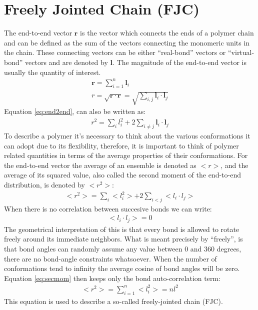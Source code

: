 \section{Freely Jointed Chain (FJC)}
The end-to-end  vector $\mathbf{r}$ is  the vector which  connects the
ends of a polymer  chain and can be defined as the  sum of the vectors
connecting the monomeric units  in the chain. These connecting vectors
can be  either ``real-bond''  vectors or ``virtual-bond''  vectors and
are denoted  by $\mathbf{l}$.  The magnitude of  the end-to-end vector
is usually the quantity of interest.
\begin{gather}
\mathbf{r} = \sum_{i=1}^{n} \mathbf{l}_{i}\\
\label{eq:end2end}
r = \sqrt{\mathbf{r} \cdot \mathbf{r}}
  = \sqrt{\sum_{i,j}\mathbf{l}_{i} \cdot \mathbf{l}_{j}}
\end{gather}
Equation \ref{eq:end2end}, can also be written as:
\begin{gather}
r^2 = \sum_{i}l_{i}^{2} + 2 \sum_{i\neq j} \mathbf{l}_{i} \cdot \mathbf{l}_{j}
\end{gather}  
To  describe a  polymer  it's  necessary to  think  about the  various
conformations it  can adopt due  to its flexibility, therefore,  it is
important  to think  of polymer  related  quantities in  terms of  the
average properties  of their conformations. For  the end-to-end vector
the average of an ensemble is denoted as $<r>$, and the average of its
squared  value,  also  called  the  second moment  of  the  end-to-end
distribution, is denoted by $<r^2>$:
\begin{gather}
\label{eq:secmom}  
<r^2>=\sum_{i}<l_{i}^2> + 2\sum_{i<j}<l_{i} \cdot l_{j}>
\end{gather}  
When there is no correlation between succesive bonds we can write:
\begin{gather}
\label{eq:nocorr}
<l_{i} \cdot l_{j}> = 0
\end{gather}
The geometrical interpretation  of this is that every  bond is allowed
to  rotate  freely around  its  immediate  neighbors.   What is  meant
precisely by ``freely'',  is that bond angles can  randomly assume any
value between 0  and 360 degrees, there are  no bond-angle constraints
whatsoever.   When the number  of conformations  tend to  infinity the
average cosine of bond  angles will be zero.  Equation \ref{eq:secmom}
then keeps only the bond auto-correlation term:
\begin{gather}
<r^2> = \sum_{i=1}^{n}<l_{i}^2> = nl^2
\end{gather}  
This equation is used to describe a so-called freely-jointed chain (FJC). 

